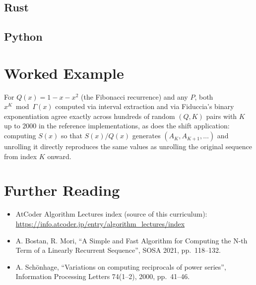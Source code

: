 \documentclass[11pt]{article}
\begin{document}
\codenote
\subsection{Rust}

\subsection{Python}

\section{Worked Example}
\begin{examplebox}
For $Q(x)=1-x-x^2$ (the Fibonacci recurrence) and any $P$, both
$x^K \bmod \Gamma(x)$ computed via interval extraction and via Fiduccia's
binary exponentiation agree exactly across hundreds of random $(Q,K)$
pairs with $K$ up to $2000$ in the reference implementations, as does the
shift application: computing $S(x)$ so that $S(x)/Q(x)$ generates
$(A_K,A_{K+1},\ldots)$ and unrolling it directly reproduces the same
values as unrolling the original sequence from index $K$ onward.
\end{examplebox}

\section{Further Reading}
\begin{itemize}[leftmargin=1.5em]
  \item AtCoder Algorithm Lectures index (source of this curriculum):
        \url{https://info.atcoder.jp/entry/algorithm_lectures/index}
  \item A. Bostan, R. Mori, ``A Simple and Fast Algorithm for Computing
        the N-th Term of a Linearly Recurrent Sequence'', SOSA 2021,
        pp.\ 118--132.
  \item A. Sch\"onhage, ``Variations on computing reciprocals of power
        series'', Information Processing Letters 74(1--2), 2000,
        pp.\ 41--46.
\end{itemize}
\end{document}

